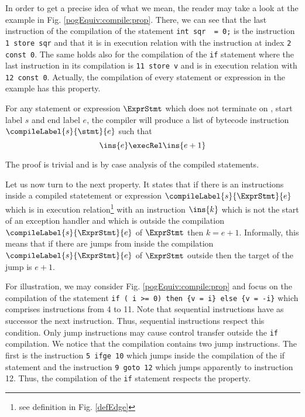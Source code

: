 In order to get a precise idea of what we mean, the reader may take a look at the example in Fig. \ref{pogEquiv:compile:prop}.
There, we can see that the last instruction of the compilation of the statement \lstinline!int sqr  = 0;! is the instruction \lstinline!1 store sqr! 
and that it is in execution relation with the instruction at index \lstinline!2 const 0!. The same holds also for the compilation of the \lstinline!if!
statement where the last instruction  in its compilation is \lstinline!11 store v! and is  in execution relation with \lstinline!12 const 0!.
Actually, the compilation of every statement or expression in the example has this property.

\begin{compProp0}\label{compile:prop:compProp0}
 For any statement or expression $\ExprStmt$ which does not terminate on \return, start label $s$ and end label $e$,
    the compiler will produce a list of bytecode instruction $\compileLabel{s}{\stmt}{e}$ such that 
     $$ \ins{e} \execRel \ins{e+1}$$
\end{compProp0}
The proof is trivial and is by case analysis of the compiled statements.

Let us now turn to the next property. It states  that  if there is an instructions inside a compiled statetement or expression 
 $\compileLabel{s}{\ExprStmt}{e}$ which   is in execution relation\footnote{see definition in Fig. \ref{defEdge}}  with an instruction 
$\ins{k}$ which is not the start of an exception handler and which is outside the compilation $\compileLabel{s}{\ExprStmt }{e}$
of $\ExprStmt$  then   $ k  = e +1$. Informally,  this means that if there are jumps from inside the compilation  $\compileLabel{s}{\ExprStmt}{e}$  of $\ExprStmt$   
outside then the target of the jump is $e +1$.

For illustration, we may consider Fig. \ref{pogEquiv:compile:prop} and focus on the compilation of the statement  
\lstinline!if ( i >= 0) then {v = i} else {v = -i}! 
which comprises instructions from 4 to 11. Note that sequential instructions   have as  successor the next instruction.  Thus, sequential
instructions respect this condition. 
Only jump instructions may cause control transfer outside the \lstinline!if! compilation. 
We notice that the compilation contains two jump instructions. 
The first is the instruction \lstinline!5 ifge 10! which jumps inside the compilation of the if statement
and the instruction \lstinline!9 goto 12!  which jumps apparently to instruction 12. 
Thus, the compilation of the \lstinline!if! statement respects the property.

